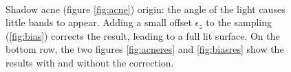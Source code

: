 \begin{figure}
\centering
{}
 \\

\caption{Shadow acne (figure \ref{fig:acne}) origin: the angle of the light causes little bands to appear. Adding a small offset $\epsilon_z$ to the sampling (\ref{fig:bias}) corrects the result, leading to a full lit surface. On the bottom row, the two figures \ref{fig:acneres} and \ref{fig:biasres} show the results with and without the correction.}
\label{fig:shadowbias}
\end{figure}


